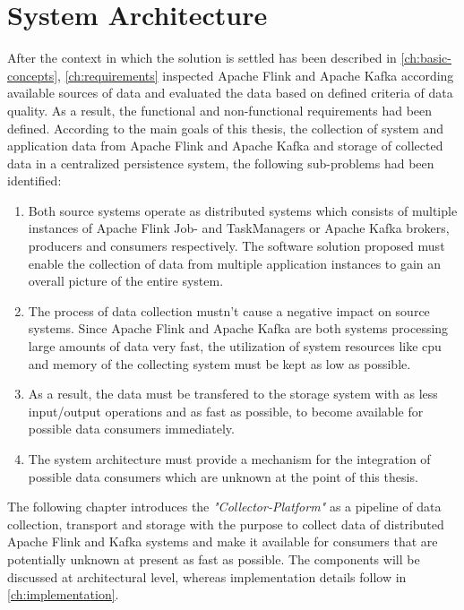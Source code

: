 \chapter{System Architecture}
\label{ch:architecture}

After the context in which the solution is settled has been described in \autoref{ch:basic-concepts}, \autoref{ch:requirements}
inspected Apache Flink and Apache Kafka according available sources of data and evaluated the data based on defined criteria
of data quality. As a result, the functional and non-functional requirements had been defined. According to the main goals of this thesis,
the collection of system and application data from Apache Flink and Apache Kafka and storage of collected data in a
centralized persistence system, the following sub-problems had been identified:

\begin{enumerate}
    \item Both source systems operate as distributed systems which consists of multiple instances of Apache
    Flink Job- and TaskManagers or Apache Kafka brokers, producers and consumers respectively. The software solution proposed
    must enable the collection of data from multiple application instances to gain an overall picture of the entire system.
    \item The process of data collection mustn't cause a negative impact on source systems. Since Apache Flink and Apache Kafka
    are both systems processing large amounts of data very fast, the utilization of system resources like cpu and memory of the
    collecting system must be kept as low as possible.
    \item As a result, the data must be transfered to the storage system with as less input/output operations and as fast
    as possible, to become available for possible data consumers immediately.
    \item The system architecture must provide a mechanism for the integration of possible data consumers which are unknown at
    the point of this thesis.
\end{enumerate}

The following chapter introduces the \textit{"Collector-Platform"} as a pipeline of data collection, transport and storage with the purpose
to collect data of distributed Apache Flink and Kafka systems and make it available for consumers that are potentially unknown at present
as fast as possible. The components will be discussed at architectural level, whereas implementation details follow in \autoref{ch:implementation}.

